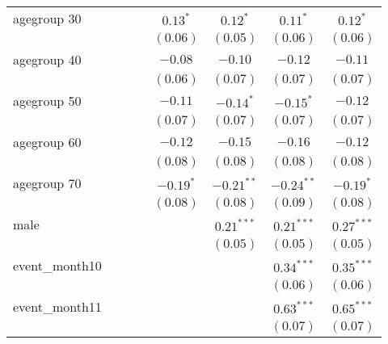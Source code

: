 \begin{table}
\begin{center}
\begin{tabular}{l c c c c c c c }
agegroup 30        &              &              &              & $0.13^{*}$   & $0.12^{*}$   & $0.11^{*}$   & $0.12^{*}$    \\
                   &              &              &              & $(0.06)$     & $(0.05)$     & $(0.06)$     & $(0.06)$      \\
agegroup 40        &              &              &              & $-0.08$      & $-0.10$      & $-0.12$      & $-0.11$       \\
                   &              &              &              & $(0.06)$     & $(0.07)$     & $(0.07)$     & $(0.07)$      \\
agegroup 50        &              &              &              & $-0.11$      & $-0.14^{*}$  & $-0.15^{*}$  & $-0.12$       \\
                   &              &              &              & $(0.07)$     & $(0.07)$     & $(0.07)$     & $(0.07)$      \\
agegroup 60        &              &              &              & $-0.12$      & $-0.15$      & $-0.16$      & $-0.12$       \\
                   &              &              &              & $(0.08)$     & $(0.08)$     & $(0.08)$     & $(0.08)$      \\
agegroup 70        &              &              &              & $-0.19^{*}$  & $-0.21^{**}$ & $-0.24^{**}$ & $-0.19^{*}$   \\
                   &              &              &              & $(0.08)$     & $(0.08)$     & $(0.09)$     & $(0.08)$      \\
male               &              &              &              &              & $0.21^{***}$ & $0.21^{***}$ & $0.27^{***}$  \\
                   &              &              &              &              & $(0.05)$     & $(0.05)$     & $(0.05)$      \\
event\_month10     &              &              &              &              &              & $0.34^{***}$ & $0.35^{***}$  \\
                   &              &              &              &              &              & $(0.06)$     & $(0.06)$      \\
event\_month11     &              &              &              &              &              & $0.63^{***}$ & $0.65^{***}$  \\
                   &              &              &              &              &              & $(0.07)$     & $(0.07)$      \\

\end{tabular}
\end{center}
\end{table}
